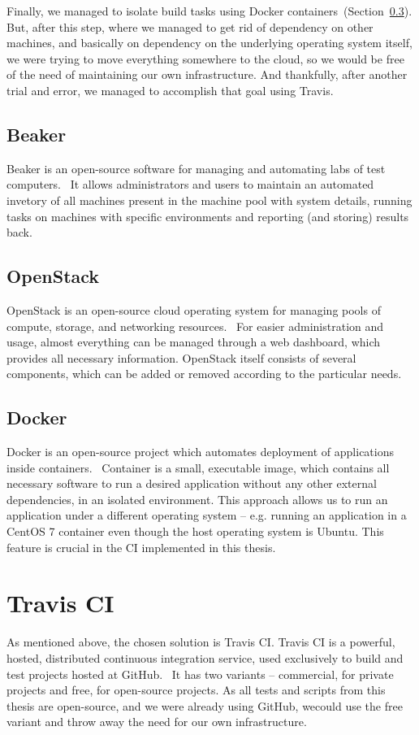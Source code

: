     Finally, we managed to isolate build tasks using Docker containers~(Section~\ref{ref:docker}).
    But, after this step, where we managed to get rid of dependency on other machines,
    and basically on dependency on the underlying operating system itself, we
    were trying to move everything somewhere to the cloud, so we would be free
    of the need of maintaining our own infrastructure. And thankfully, after
    another trial and error, we managed to accomplish that goal using Travis.

\subsection{Beaker} \label{ref:beaker}
    Beaker is an open-source software for managing and automating labs of test
    computers.~\cite{beaker-docs} It allows administrators and users to maintain an
    automated invetory of all machines present in the machine pool with
    system details, running tasks on machines with specific environments and
    reporting (and storing) results back.

\subsection{OpenStack} \label{ref:openstack}
    OpenStack is an open-source cloud operating system for managing pools of compute, storage,
    and networking resources.~\cite{openstack-docs} For easier administration and
    usage, almost everything can be managed through a web dashboard, which provides
    all necessary information. OpenStack itself consists of several components,
    which can be added or removed according to the particular needs.

\subsection{Docker} \label{ref:docker}
    Docker is an open-source project which automates deployment of applications
    inside containers.~\cite{docker-docs} Container is a small, executable image,
    which contains all necessary software to run a desired application without
    any other external dependencies, in an isolated environment. This approach
    allows us to run an application under a different operating system -- e.g.
    running an application in a CentOS 7 container even though the host operating
    system is Ubuntu. This feature is crucial in the CI implemented in this thesis.

\section{Travis CI}
    As mentioned above, the chosen solution is Travis CI. Travis CI is a powerful,
    hosted, distributed continuous integration service, used exclusively to
    build and test projects hosted at GitHub.~\cite{travis-ci-docs} It has two
    variants -- commercial, for private projects and free, for open-source
    projects. As all tests and scripts from this thesis are open-source, and
    we were already using GitHub, wecould use the free variant and throw away
    the need for our own infrastructure.

